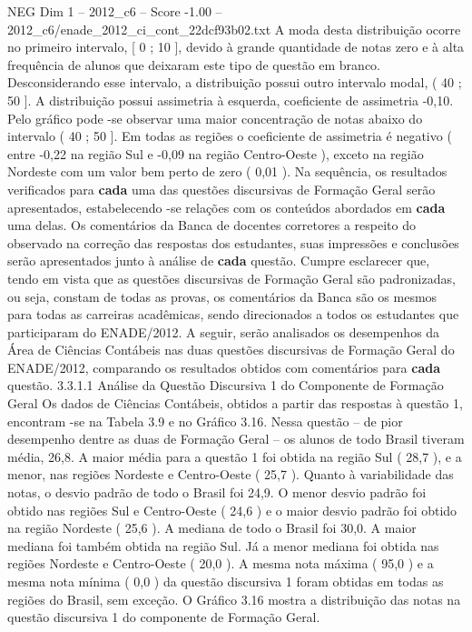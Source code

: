 \begin{textsample}{NEG Dim 1 – 2012\_c6 – Score -1.00 – 2012\_c6/enade\_2012\_ci\_cont\_22dcf93b02.txt}
A moda desta distribuição ocorre no primeiro intervalo, [ 0 ; 10 ], devido à grande quantidade de notas zero e à alta frequência de alunos que deixaram este tipo de questão em branco.
Desconsiderando esse intervalo, a distribuição possui outro intervalo modal, ( 40 ; 50 ].
A distribuição possui assimetria à esquerda, coeficiente de assimetria -0,10.
Pelo gráfico pode -se observar uma maior concentração de notas abaixo do intervalo ( 40 ; 50 ].
Em todas as regiões o coeficiente de assimetria é negativo ( entre -0,22 na região Sul e -0,09 na região Centro-Oeste ), exceto na região Nordeste com um valor bem perto de zero ( 0,01 ).
Na sequência, os resultados verificados para \textbf{cada} uma das questões discursivas de Formação Geral serão apresentados, estabelecendo -se relações com os conteúdos abordados em \textbf{cada} uma delas.
Os comentários da Banca de docentes corretores a respeito do observado na correção das respostas dos estudantes, suas impressões e conclusões serão apresentados junto à análise de \textbf{cada} questão.
Cumpre esclarecer que, tendo em vista que as questões discursivas de Formação Geral são padronizadas, ou seja, constam de todas as provas, os comentários da Banca são os mesmos para todas as carreiras acadêmicas, sendo direcionados a todos os estudantes que participaram do ENADE/2012.
A seguir, serão analisados os desempenhos da Área de Ciências Contábeis nas duas questões discursivas de Formação Geral do ENADE/2012, comparando os resultados obtidos com comentários para \textbf{cada} questão. 3.3.1.1 Análise da Questão Discursiva 1 do Componente de Formação Geral Os dados de Ciências Contábeis, obtidos a partir das respostas à questão 1, encontram -se na Tabela 3.9 e no Gráfico 3.16.
Nessa questão – de pior desempenho dentre as duas de Formação Geral – os alunos de todo Brasil tiveram média, 26,8.
A maior média para a questão 1 foi obtida na região Sul ( 28,7 ), e a menor, nas regiões Nordeste e Centro-Oeste ( 25,7 ).
Quanto à variabilidade das notas, o desvio padrão de todo o Brasil foi 24,9.
O menor desvio padrão foi obtido nas regiões Sul e Centro-Oeste ( 24,6 ) e o maior desvio padrão foi obtido na região Nordeste ( 25,6 ).
A mediana de todo o Brasil foi 30,0.
A maior mediana foi também obtida na região Sul.
Já a menor mediana foi obtida nas regiões Nordeste e Centro-Oeste ( 20,0 ).
A mesma nota máxima ( 95,0 ) e a mesma nota mínima ( 0,0 ) da questão discursiva 1 foram obtidas em todas as regiões do Brasil, sem exceção.
O Gráfico 3.16 mostra a distribuição das notas na questão discursiva 1 do componente de Formação Geral.

\end{textsample}
